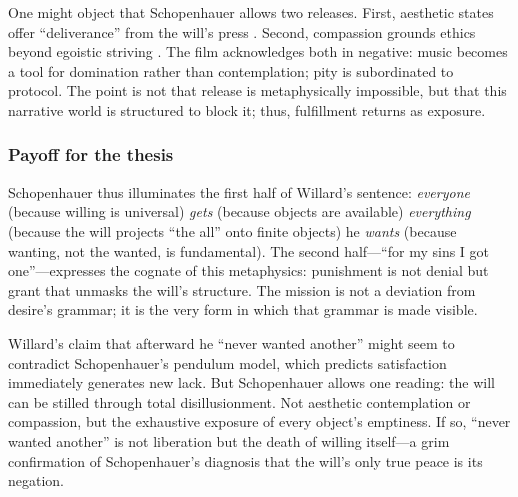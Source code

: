 One might object that Schopenhauer allows two releases. First, aesthetic states offer
``deliverance'' from the will's press \parencite[p.~178]{SchopenhauerWWR1969}. Second,
compassion grounds ethics beyond egoistic striving \parencite[pp.~372--374]{SchopenhauerWWR1969}.
The film acknowledges both in negative: music becomes a tool for domination rather than
contemplation; pity is subordinated to protocol. The point is not that release is metaphysically
impossible, but that this narrative world is structured to block it; thus, fulfillment returns
as exposure.

\subsubsection*{Payoff for the thesis}

Schopenhauer thus illuminates the first half of Willard's sentence: \emph{everyone} (because
willing is universal) \emph{gets} (because objects are available) \emph{everything} (because
the will projects ``the all'' onto finite objects) he \emph{wants} (because wanting, not the
wanted, is fundamental). The second half—``for my sins I got one''—expresses the cognate of this
metaphysics: punishment is not denial but grant that unmasks the will's structure. The mission
is not a deviation from desire's grammar; it is the very form in which that grammar is made
visible.

Willard's claim that afterward he ``never wanted another'' might seem to contradict
Schopenhauer's pendulum model, which predicts satisfaction immediately generates new lack. But
Schopenhauer allows one reading: the will can be stilled through total disillusionment. Not
aesthetic contemplation or compassion, but the exhaustive exposure of every object's
emptiness. If so, ``never wanted another'' is not liberation but the death of willing
itself---a grim confirmation of Schopenhauer's diagnosis that the will's only true peace is
its negation.
